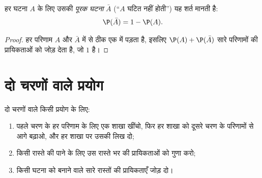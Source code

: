 \begin{proposition}[पूरक]\label{prop:g9:statproba:complement}
हर घटना $A$ के लिए उसकी \emph{पूरक घटना} $\bar A$ (``$A$ घटित नहीं
होती'') यह शर्त मानती है:
\[
\P(\bar A) = 1 - \P(A).
\]
\end{proposition}

\begin{proof}
हर परिणाम $A$ और $\bar A$ में से ठीक एक में पड़ता है, इसलिए
$\P(A) + \P(\bar A)$ सारे परिणामों की प्रायिकताओं को जोड़ देता है,
जो $1$ है।
\end{proof}

\section{दो चरणों वाले प्रयोग}

\begin{method}[वृक्ष आरेख]\label{met:g9:statproba:tree}
दो चरणों वाले किसी प्रयोग के लिए:
\begin{enumerate}
  \item पहले चरण के हर परिणाम के लिए एक शाखा खींचो, फिर हर शाखा को
        दूसरे चरण के परिणामों से आगे बढ़ाओ, और हर शाखा पर उसकी
         लिख दो;
  \item किसी रास्ते की  पाने के लिए उस रास्ते भर की
        प्रायिकताओं को गुणा करो;
  \item किसी घटना को बनाने वाले सारे रास्तों की प्रायिकताएँ जोड़ दो।
\end{enumerate}
\end{method}

